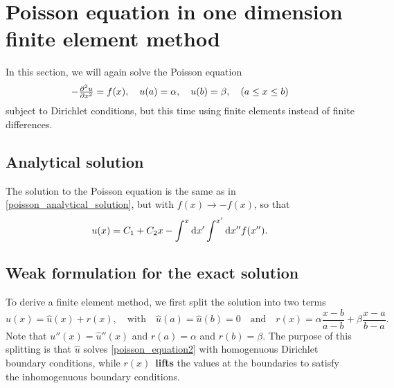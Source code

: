 \section{Poisson equation in one dimension finite element method}

\newcommand\basisexpand[2]{\sum_{i=0}^{M+1} #1_i \varphi_i(#2)}
\newcommand\integral[4]{\int_#3^#4 \dif #2 \, #1}

In this section, we will again solve the Poisson equation
\begin{equation}
	-\pd[2]{u}{x} = f(x), \quad u(a) = \alpha, \quad u(b) = \beta, \quad (a \leq x \leq b)
	\label{poisson_equation2}
\end{equation}
subject to Dirichlet conditions, but this time using finite elements instead of finite differences.

\subsection{Analytical solution}

The solution to the Poisson equation is the same as in \ref{poisson_analytical_solution}, but with $f(x) \rightarrow -f(x)$, so that
\begin{equation}
u(x) = C_1 + C_2 x - \int^x \dif x' \int^{x'} \dif x'' f(x'').
\label{poisson_analytical_solution2}
\end{equation}

\subsection{Weak formulation for the exact solution}

To derive a finite element method, we first split the solution into two terms
\begin{equation}
	u(x) = \hat{u}(x) + r(x), \quad \text{with} \quad \hat{u}(a) = \hat{u}(b) = 0 \quad \text{and} \quad r(x) = \alpha \frac{x-b}{a-b} + \beta \frac{x-a}{b-a}.
	\label{splitting_exact}
\end{equation}
Note that $u''(x) = \hat{u}''(x)$ and $r(a) = \alpha$ and $r(b) = \beta$.
The purpose of this splitting is that $\hat{u}$ solves \ref{poisson_equation2} with homogenuous Dirichlet boundary conditions, while $r(x)$ \textbf{lifts} the values at the boundaries to satisfy the inhomogenuous boundary conditions.

